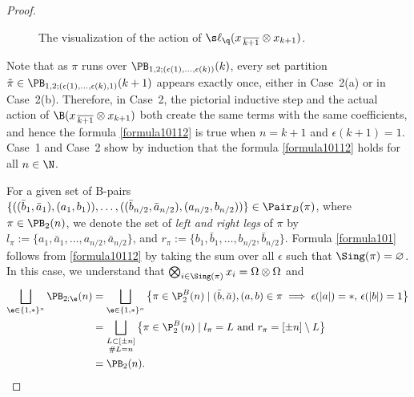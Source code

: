 \begin{proof}
\begin{figure}[h]
\centering
{} %
\caption{The visualization of the action of $\s \ell_{\q}(x_{\,\overline{k+1}}\otimes x_{k+1})$.}
\label{figtracepositive}
\end{figure}


Note that as $\pi$ runs over $\PB_{1,2;(\epsilon(1),\dots,\epsilon(k))}(k)$, every set partition $\tilde{\pi}\in \PB_{1,2;(\epsilon(1),\dots,\epsilon(k),1)}(k+1)$ appears exactly once, either in Case~2(a) or in Case~2(b). Therefore, in Case~2, the pictorial inductive step and the actual action of $\B(x_{\,\overline{k+1}}\otimes x_{k+1})$ both create the same terms with the same coefficients, and hence the formula \eqref{formula10112} is true when $n=k+1$ and $\epsilon(k+1)=1$. Case~1 and Case~2 show by induction that the formula \eqref{formula10112} holds for all $n \in \N$.

For a given set of B-pairs $\{((\bar b_1, \bar a_1),(a_1,b_1)), \dots, ((\bar b_{n/2}, \bar a_{n/2}),(a_{n/2},b_{n/2}))\}\in \Pair_B( \pi) $,
where $\pi \in \PB_{2}(n)$, we denote the set of \emph{left and right legs} of $\pi$ by $l_\pi :=\{ a_1,\bar a_1,\dots, a_{n/2}, \bar a_{n/2} \}$, and $r_\pi :=\{ b_1,\bar b_1,\dots, b_{n/2}, \bar b_{n/2} \}$. Formula \eqref{formula101} follows from \eqref{formula10112} by taking the sum over all $\epsilon$ such that $\Sing(\pi)=\varnothing$. In this case, we understand that $\bigotimes_{i\in \Sing(\pi)} x_i=\Omega\otimes \Omega $ and
\begin{align*}
\bigsqcup_{\e\in\{1,\ast\}^{n}} \PB_{2;\e}(n)&=\bigsqcup_{\e\in\{1,\ast\}^{n}} \big\{\pi \in \P_{2}^{B}(n)\mid (\bar b,\bar a ), (a,b)\in \pi \implies \epsilon(|a|)= \ast,\, \epsilon(|b|)=1\big\}
\\
& =\bigsqcup_{\substack{ L\subset [\pm n] \\ \# L =n
}} \big\{\pi \in \P_{2}^{B}(n)\mid
l_\pi=L \text{ and }r_\pi = [\pm n]\setminus L\big\}
\\
&=\PB_{2}(n).
\end{align*}


\end{proof}
